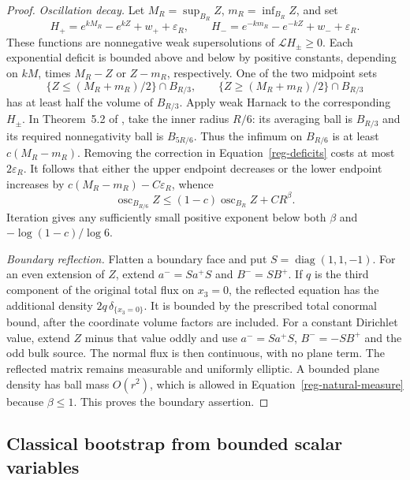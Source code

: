 \begin{proof}
\emph{Oscillation decay.}
Let $M_R=\sup_{B_R}Z$, $m_R=\inf_{B_R}Z$, and set
\begin{equation}
 H_+=e^{kM_R}-e^{kZ}+w_++\varepsilon_R,
 \qquad
 H_-=e^{-km_R}-e^{-kZ}+w_-+\varepsilon_R.
 \label{reg-deficits}
\end{equation}
These functions are nonnegative weak supersolutions of
$\mathcal LH_\pm\ge0$. Each exponential deficit is bounded
above and below by positive constants, depending on $kM$, times
$M_R-Z$ or $Z-m_R$, respectively. One of the two midpoint sets
\[
 \{Z\le(M_R+m_R)/2\}\cap B_{R/3},\qquad
 \{Z\ge(M_R+m_R)/2\}\cap B_{R/3}
\]
has at least half the volume of $B_{R/3}$. Apply weak Harnack to
the corresponding $H_\pm$. In Theorem~5.2 of
\cite{trudinger1973}, take the inner radius $R/6$: its averaging
ball is $B_{R/3}$ and its required nonnegativity ball is
$B_{5R/6}$. Thus the infimum on $B_{R/6}$ is at least
$c(M_R-m_R)$. Removing the correction in
Equation~\eqref{reg-deficits} costs at most $2\varepsilon_R$.
It follows that either the upper endpoint decreases or the lower
endpoint increases by $c(M_R-m_R)-C\varepsilon_R$, whence
\begin{equation}
 \operatorname{osc}_{B_{R/6}}Z
       \le(1-c)\operatorname{osc}_{B_R}Z+CR^\beta.
 \label{reg-oscillation-decay}
\end{equation}
Iteration gives any sufficiently small positive exponent below
both $\beta$ and $-\log(1-c)/\log6$.

\emph{Boundary reflection.} Flatten a boundary face and put
$S=\operatorname{diag}(1,1,-1)$. For an even extension of $Z$,
extend $a^-=Sa^+S$ and $B^-=SB^+$. If $q$ is the third
component of the original total flux on $x_3=0$, the reflected
equation has the additional density $2q\,\delta_{\{x_3=0\}}$.
It is bounded by the prescribed total conormal bound, after the
coordinate volume factors are included. For a constant Dirichlet
value, extend $Z$ minus that value oddly and use $a^-=Sa^+S$,
$B^-=-SB^+$ and the odd bulk source. The normal flux is then
continuous, with no plane term. The reflected matrix remains
measurable and uniformly elliptic. A bounded plane density has
ball mass $O(r^2)$, which is allowed in
Equation~\eqref{reg-natural-measure} because $\beta\le1$.
This proves the boundary assertion.
\end{proof}

\subsection{Classical bootstrap from bounded scalar variables}

